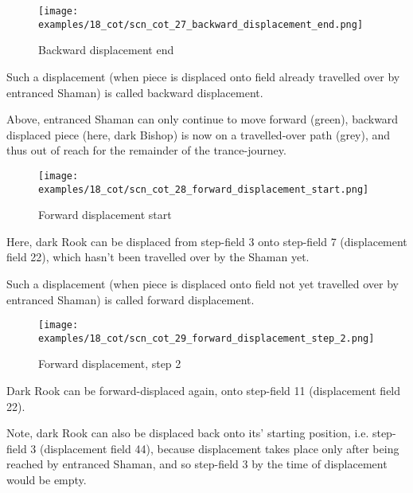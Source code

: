 \clearpage %

\noindent
\begin{figure}[!h]
\texttt{[image: examples/18\_cot/scn\_cot\_27\_backward\_displacement\_end.png]}
\caption{Backward displacement end}
\label{fig:scn_cot_27_backward_displacement_end}
\end{figure}

Such a displacement (when piece is displaced onto field already travelled over
by entranced Shaman) is called backward displacement.

Above, entranced Shaman can only continue to move forward (green), backward displaced
piece (here, dark Bishop) is now on a travelled-over path (grey), and thus out of reach
for the remainder of the trance-journey.

\clearpage %

\noindent
\begin{figure}[!h]
\texttt{[image: examples/18\_cot/scn\_cot\_28\_forward\_displacement\_start.png]}
\caption{Forward displacement start}
\label{fig:scn_cot_28_forward_displacement_start}
\end{figure}

Here, dark Rook can be displaced from step-field 3 onto step-field 7 (displacement field 22),
which hasn't been travelled over by the Shaman yet.

Such a displacement (when piece is displaced onto field not yet travelled over by entranced Shaman)
is called forward displacement.

\clearpage %

\noindent
\begin{figure}[!h]
\texttt{[image: examples/18\_cot/scn\_cot\_29\_forward\_displacement\_step\_2.png]}
\caption{Forward displacement, step 2}
\label{fig:scn_cot_29_forward_displacement_step_2}
\end{figure}

Dark Rook can be forward-displaced again, onto step-field 11 (displacement field 22).

Note, dark Rook can also be displaced back onto its' starting position, i.e. step-field 3
(displacement field 44), because displacement takes place only after being reached by
entranced Shaman, and so step-field 3 by the time of displacement would be empty.

